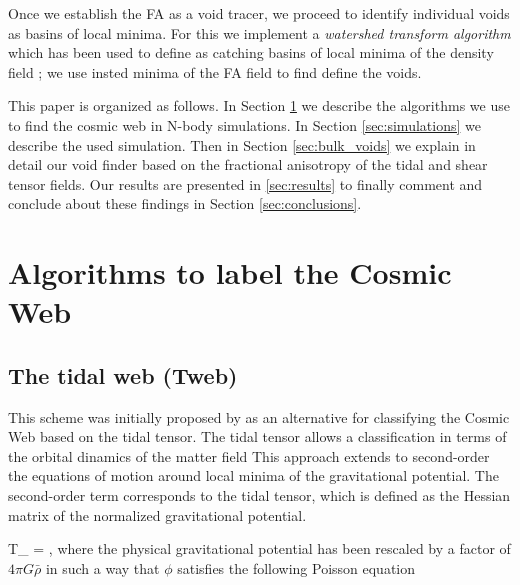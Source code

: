 \documentclass[a4,useAMS,usenatbib,usegraphicx]{latex/mn2e}
\begin{document}
Once we establish the FA as a void tracer, we proceed to
identify individual voids as basins of local minima. 
For this we implement a \textit{watershed transform algorithm}
\citep{Beucher79,Beucher93} which has been used to define as catching
basins of local minima of the density field
\citep{Platen07,Neyrinck08}; we use insted minima of the FA field to
find define the voids. 


This paper is organized as follows. 
In Section \ref{sec:algorithms_cosmic_web} we describe the algorithms
we use to find the cosmic web in N-body simulations. In Section 
\ref{sec:simulations} we describe the used simulation.
Then in Section \ref{sec:bulk_voids} we explain in detail our void
finder based on the fractional anisotropy of the tidal and shear
tensor fields.
Our results are presented in \ref{sec:results} to finally comment and
conclude about these findings in Section \ref{sec:conclusions}. 


\section{Algorithms to label the Cosmic Web}
\label{sec:algorithms_cosmic_web}


\subsection{The tidal web (Tweb)}
\label{subsec:Tweb}


This scheme was initially proposed by \citet{Hahn07} as an
alternative for classifying the Cosmic Web based on the tidal tensor.
The tidal tensor allows a classification in terms of the orbital
dinamics of the matter field
This approach extends to second-order the equations of motion around 
local minima of the gravitational potential. 
The second-order term corresponds to the tidal tensor, which is
defined as the Hessian matrix of the normalized gravitational
potential.


{	T_{\alpha\beta} = ,	}
where the physical gravitational potential has been rescaled by a
factor of   $4\pi G\bar{\rho}$ in such a way that $\phi$ satisfies the following 
Poisson equation
\end{document}
